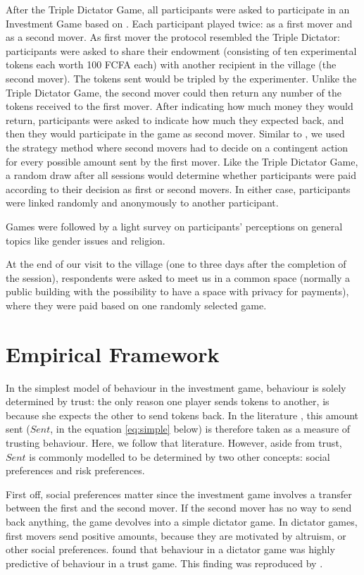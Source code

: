 After the Triple Dictator Game, all participants were asked to participate in an Investment Game based on \cite{Berg1995}. Each participant played twice: as a first mover and as a second mover. As first mover the protocol resembled the Triple Dictator: participants were asked to share their endowment (consisting of ten experimental tokens each worth 100 FCFA each) with another recipient in the village (the second mover). The tokens sent would be tripled by the experimenter. Unlike the Triple Dictator Game, the second mover could then return any number of the tokens received to the first mover. After indicating how much money they would return, participants were asked to indicate how much they expected back, and then they would participate in the game as second mover. Similar to \cite{Ashraf2006}, we used the strategy method where second movers had to decide on a contingent action for every possible amount sent by the first mover. Like the Triple Dictator Game, a random draw after all sessions would determine whether participants were paid according to their decision as first or second movers. In either case, participants were linked randomly and anonymously to another participant.

Games were followed by a light survey on participants' perceptions on general topics like gender issues and religion.

At the end of our visit to the village (one to three days after the completion of the session), respondents were asked to meet us in a common space (normally a public building with the possibility to have a space with privacy for payments), where they were paid based on one randomly selected game.


\section{Empirical Framework}
In the simplest model of behaviour in the investment game, behaviour is solely determined by trust: the only reason one player sends tokens to another, is because she expects the other to send tokens back. In the literature \citep[e.g.][]{Ashraf2006}, this amount sent ($Sent$, in the equation \ref{eq:simple} below) is therefore taken as a measure of trusting behaviour. Here, we follow that literature. However, aside from trust, $Sent$  is commonly modelled to be determined by two other concepts: social preferences and risk preferences. 

First off, social preferences matter since the investment game involves a transfer between the first and the second mover. If the second mover has no way to send back anything, the game devolves into a simple dictator game. In dictator games, first movers send positive amounts, because they are motivated by altruism, or other social preferences. \cite{Cox2004} found that behaviour in a dictator game was highly predictive of behaviour in a trust game. This finding was reproduced by \citep{Ashraf2006}.

